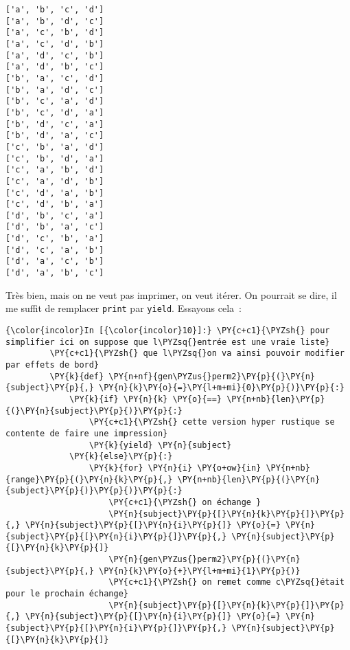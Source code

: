     \begin{Verbatim}[commandchars=\\\{\}]
['a', 'b', 'c', 'd']
['a', 'b', 'd', 'c']
['a', 'c', 'b', 'd']
['a', 'c', 'd', 'b']
['a', 'd', 'c', 'b']
['a', 'd', 'b', 'c']
['b', 'a', 'c', 'd']
['b', 'a', 'd', 'c']
['b', 'c', 'a', 'd']
['b', 'c', 'd', 'a']
['b', 'd', 'c', 'a']
['b', 'd', 'a', 'c']
['c', 'b', 'a', 'd']
['c', 'b', 'd', 'a']
['c', 'a', 'b', 'd']
['c', 'a', 'd', 'b']
['c', 'd', 'a', 'b']
['c', 'd', 'b', 'a']
['d', 'b', 'c', 'a']
['d', 'b', 'a', 'c']
['d', 'c', 'b', 'a']
['d', 'c', 'a', 'b']
['d', 'a', 'c', 'b']
['d', 'a', 'b', 'c']

    \end{Verbatim}

    Très bien, mais on ne veut pas imprimer, on veut itérer. On pourrait se
dire, il me suffit de remplacer \texttt{print} par \texttt{yield}.
Essayons cela~:

    \begin{Verbatim}[commandchars=\\\{\}]
{\color{incolor}In [{\color{incolor}10}]:} \PY{c+c1}{\PYZsh{} pour simplifier ici on suppose que l\PYZsq{}entrée est une vraie liste}
         \PY{c+c1}{\PYZsh{} que l\PYZsq{}on va ainsi pouvoir modifier par effets de bord}
         \PY{k}{def} \PY{n+nf}{gen\PYZus{}perm2}\PY{p}{(}\PY{n}{subject}\PY{p}{,} \PY{n}{k}\PY{o}{=}\PY{l+m+mi}{0}\PY{p}{)}\PY{p}{:}
             \PY{k}{if} \PY{n}{k} \PY{o}{==} \PY{n+nb}{len}\PY{p}{(}\PY{n}{subject}\PY{p}{)}\PY{p}{:}
                 \PY{c+c1}{\PYZsh{} cette version hyper rustique se contente de faire une impression}
                 \PY{k}{yield} \PY{n}{subject}
             \PY{k}{else}\PY{p}{:}
                 \PY{k}{for} \PY{n}{i} \PY{o+ow}{in} \PY{n+nb}{range}\PY{p}{(}\PY{n}{k}\PY{p}{,} \PY{n+nb}{len}\PY{p}{(}\PY{n}{subject}\PY{p}{)}\PY{p}{)}\PY{p}{:}
                     \PY{c+c1}{\PYZsh{} on échange }
                     \PY{n}{subject}\PY{p}{[}\PY{n}{k}\PY{p}{]}\PY{p}{,} \PY{n}{subject}\PY{p}{[}\PY{n}{i}\PY{p}{]} \PY{o}{=} \PY{n}{subject}\PY{p}{[}\PY{n}{i}\PY{p}{]}\PY{p}{,} \PY{n}{subject}\PY{p}{[}\PY{n}{k}\PY{p}{]}
                     \PY{n}{gen\PYZus{}perm2}\PY{p}{(}\PY{n}{subject}\PY{p}{,} \PY{n}{k}\PY{o}{+}\PY{l+m+mi}{1}\PY{p}{)}
                     \PY{c+c1}{\PYZsh{} on remet comme c\PYZsq{}était pour le prochain échange}
                     \PY{n}{subject}\PY{p}{[}\PY{n}{k}\PY{p}{]}\PY{p}{,} \PY{n}{subject}\PY{p}{[}\PY{n}{i}\PY{p}{]} \PY{o}{=} \PY{n}{subject}\PY{p}{[}\PY{n}{i}\PY{p}{]}\PY{p}{,} \PY{n}{subject}\PY{p}{[}\PY{n}{k}\PY{p}{]}
\end{Verbatim}


